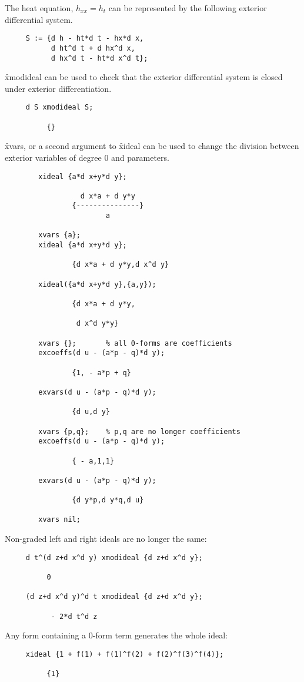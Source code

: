 The heat equation, $h_{xx}=h_t$ can be represented by the following
exterior differential system. 
\begin{verbatim}
     S := {d h - ht*d t - hx*d x,
           d ht^d t + d hx^d x,
           d hx^d t - ht*d x^d t};
\end{verbatim}
\f{xmodideal} can be used to check that the exterior differential system is
closed under exterior differentiation.
\begin{verbatim}
     d S xmodideal S;

          {}
\end{verbatim}

\f{xvars}, or a second argument to \f{xideal} can be used to change the
division between exterior variables of degree 0 and parameters.
\begin{verbatim}
        xideal {a*d x+y*d y};

                  d x*a + d y*y
                {---------------}
                        a

        xvars {a};
        xideal {a*d x+y*d y};
 
                {d x*a + d y*y,d x^d y}
 
        xideal({a*d x+y*d y},{a,y});
 
                {d x*a + d y*y,
 
                 d x^d y*y}
 
        xvars {};       % all 0-forms are coefficients
        excoeffs(d u - (a*p - q)*d y);
        
                {1, - a*p + q}
        
        exvars(d u - (a*p - q)*d y);

                {d u,d y}

        xvars {p,q};    % p,q are no longer coefficients
        excoeffs(d u - (a*p - q)*d y);
        
                { - a,1,1}

        exvars(d u - (a*p - q)*d y);

                {d y*p,d y*q,d u}

        xvars nil;
\end{verbatim}


Non-graded left and right ideals are no longer the same:
\begin{verbatim}
     d t^(d z+d x^d y) xmodideal {d z+d x^d y};

          0

     (d z+d x^d y)^d t xmodideal {d z+d x^d y};

           - 2*d t^d z
\end{verbatim}
Any form containing a 0-form term generates the whole ideal:
\begin{verbatim}
     xideal {1 + f(1) + f(1)^f(2) + f(2)^f(3)^f(4)};

          {1}
\end{verbatim}

